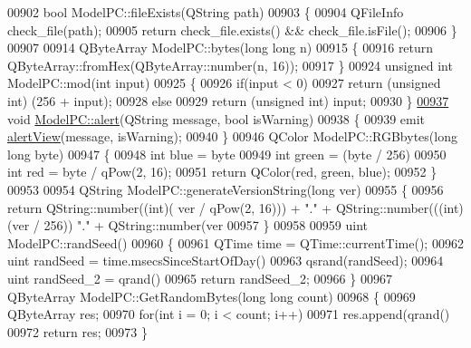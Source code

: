 \begin{DoxyCode}
{00902 \textcolor{keywordtype}{bool} ModelPC::fileExists(QString path)
00903 \{
00904     QFileInfo check\_file(path);
00905     \textcolor{keywordflow}{return} check\_file.exists() && check\_file.isFile();
00906 \}
00907 
00914 QByteArray ModelPC::bytes(\textcolor{keywordtype}{long} \textcolor{keywordtype}{long} n)
00915 \{
00916     \textcolor{keywordflow}{return} QByteArray::fromHex(QByteArray::number(n, 16));
00917 \}
00924 \textcolor{keywordtype}{unsigned} \textcolor{keywordtype}{int} ModelPC::mod(\textcolor{keywordtype}{int} input)
00925 \{
00926     \textcolor{keywordflow}{if}(input < 0)
00927         \textcolor{keywordflow}{return} (\textcolor{keywordtype}{unsigned} \textcolor{keywordtype}{int}) (256 + input);
00928     \textcolor{keywordflow}{else}
00929         \textcolor{keywordflow}{return} (\textcolor{keywordtype}{unsigned} \textcolor{keywordtype}{int}) input;
00930 \}
\hypertarget{modelpc_8cpp_source.tex_l00937}{}\hyperlink{class_model_p_c_a9079a101d83672aa48fd2dbac797de40}{00937} \textcolor{keywordtype}{void} \hyperlink{class_model_p_c_a9079a101d83672aa48fd2dbac797de40}{ModelPC::alert}(QString message, \textcolor{keywordtype}{bool} isWarning)
00938 \{
00939     emit \hyperlink{class_model_p_c_af0217a7ca5671e26090dc50a5dccdaf5}{alertView}(message, isWarning);
00940 \}
00946 QColor ModelPC::RGBbytes(\textcolor{keywordtype}{long} \textcolor{keywordtype}{long} byte)
00947 \{
00948     \textcolor{keywordtype}{int} blue = byte %
00949     \textcolor{keywordtype}{int} green = (byte / 256) %
00950     \textcolor{keywordtype}{int} red = byte / qPow(2, 16);
00951     \textcolor{keywordflow}{return} QColor(red, green, blue);
00952 \}
00953 
00954 QString ModelPC::generateVersionString(\textcolor{keywordtype}{long} ver)
00955 \{
00956     \textcolor{keywordflow}{return} QString::number((\textcolor{keywordtype}{int})( ver / qPow(2, 16))) + \textcolor{stringliteral}{"."} + QString::number(((\textcolor{keywordtype}{int}) (ver / 256)) %
      "."} + QString::number(ver %
00957 \}
00958 
00959 uint ModelPC::randSeed()
00960 \{
00961     QTime time = QTime::currentTime();
00962     uint randSeed = time.msecsSinceStartOfDay() %
00963     qsrand(randSeed);
00964     uint randSeed\_2 = qrand() %
00965     \textcolor{keywordflow}{return} randSeed\_2;
00966 \}
00967 QByteArray ModelPC::GetRandomBytes(\textcolor{keywordtype}{long} \textcolor{keywordtype}{long} count)
00968 \{
00969     QByteArray res;
00970     \textcolor{keywordflow}{for}(\textcolor{keywordtype}{int} i = 0; i < count; i++)
00971        res.append(qrand() %
00972     \textcolor{keywordflow}{return} res;
00973 \}
\end{DoxyCode}
